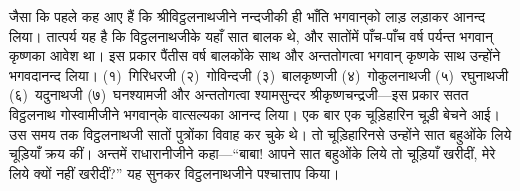 \begin{sloppypar}\justifying{}
जैसा कि पहले कह आए हैं कि श्रीविट्ठलनाथजीने नन्दजीकी ही भाँति भगवान्‌को लाड़ लड़ाकर आनन्द लिया। तात्पर्य यह है कि विट्ठलनाथजीके यहाँ सात बालक थे, और सातोंमें पाँच-पाँच वर्ष पर्यन्त भगवान् कृष्णका आवेश था। इस प्रकार पैंतीस वर्ष बालकोंके साथ और अन्ततोगत्वा भगवान् कृष्णके साथ उन्होंने भगवदानन्द लिया। (१)~गिरिधरजी (२)~गोविन्दजी (३)~बालकृष्णजी (४)~गोकुलनाथजी (५)~रघुनाथजी (६)~यदुनाथजी (७)~घनश्यामजी और अन्ततोगत्वा श्याम\-सुन्दर श्रीकृष्ण\-चन्द्रजी—इस प्रकार सतत विट्ठलनाथ गोस्वामीजीने भगवान्‌के वात्सल्यका आनन्द लिया। एक बार एक चूड़िहारिन चूड़ी बेचने आई। उस समय तक विट्ठलनाथजी सातों पुत्रोंका विवाह कर चुके थे। तो चूड़िहारिनसे उन्होंने सात बहुओंके लिये चूड़ियाँ क्रय कीं। अन्तमें राधा\-रानीजीने कहा—“बाबा! आपने सात बहुओंके लिये तो चूड़ियाँ खरीदीं, मेरे लिये क्यों नहीं खरीदीं?” यह सुनकर विट्ठलनाथजीने पश्चात्ताप किया।
\end{sloppypar}


